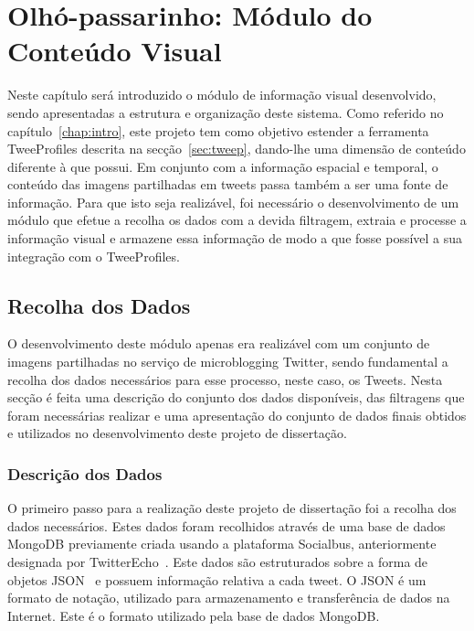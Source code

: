 \chapter{Olhó-passarinho: Módulo do Conteúdo Visual} \label{chap:chap3}

Neste capítulo será introduzido o módulo de informação visual desenvolvido, sendo apresentadas a estrutura e organização deste sistema. Como referido no capítulo~\ref{chap:intro}, este projeto tem como objetivo estender a ferramenta TweeProfiles descrita na secção~\ref{sec:tweep}, dando-lhe uma dimensão de conteúdo diferente à que possui. Em conjunto com a informação espacial e temporal, o conteúdo das imagens partilhadas em tweets passa também a ser uma fonte de informação. Para que isto seja realizável, foi necessário o desenvolvimento de um módulo que efetue a recolha os dados com a devida filtragem, extraia e processe a informação visual e armazene essa informação de modo a que fosse possível a sua integração com o TweeProfiles. 

\section{Recolha dos Dados}\label{sec:dados}

O desenvolvimento deste módulo apenas era realizável com um conjunto de imagens partilhadas no serviço de microblogging Twitter, sendo fundamental a recolha dos dados necessários para esse processo, neste caso, os Tweets. Nesta secção é feita uma descrição do conjunto dos dados disponíveis, das filtragens que foram necessárias realizar e uma apresentação do conjunto de dados finais obtidos e utilizados no desenvolvimento deste projeto de dissertação.

\subsection{Descrição dos Dados}

O primeiro passo para a realização deste projeto de dissertação foi a recolha dos dados necessários. Estes dados foram recolhidos através de uma base de dados MongoDB previamente criada usando a plataforma Socialbus, anteriormente designada por TwitterEcho~\cite{Boanjak2012}. Este dados são estruturados sobre a forma de objetos JSON~\cite{json} e possuem informação relativa a cada tweet. O JSON é um formato de notação, utilizado para armazenamento e transferência de dados na Internet. Este é o formato utilizado pela base de dados MongoDB. %


